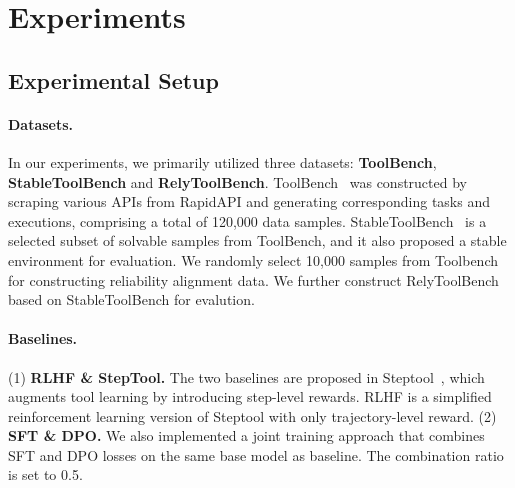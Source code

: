\section{Experiments}


% 


\subsection{Experimental Setup}

\paragraph{Datasets.} In our experiments, we primarily utilized three datasets:  \textbf{ToolBench}, \textbf{StableToolBench} and \textbf{RelyToolBench}. ToolBench~\cite{qin2023toolllm} was constructed by scraping various APIs from RapidAPI and generating corresponding tasks and executions, comprising a total of 120,000 data samples. StableToolBench~\cite{guo2024stabletoolbench} is a selected subset of solvable samples from ToolBench, and it also proposed a stable environment for evaluation.  We randomly select 10,000 samples from Toolbench for constructing reliability alignment data. We further construct RelyToolBench based on StableToolBench for evalution.


\paragraph{Baselines.} (1) \textbf{RLHF \& StepTool.}  The two baselines are proposed in Steptool~\cite{yu2024steptool}, which augments tool learning by introducing step-level rewards. RLHF is a simplified reinforcement learning version of Steptool with only trajectory-level reward. (2) \textbf{SFT \& DPO.} We also implemented a joint training approach that combines SFT and DPO losses on the same base model as baseline. The combination ratio is set to 0.5.



